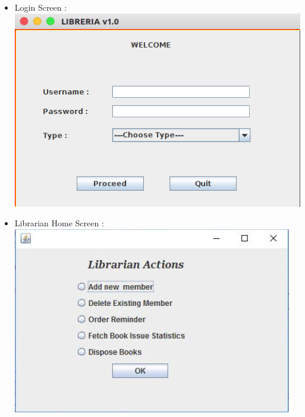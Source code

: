 \documentclass{article}
\begin{document}
\begin{itemize}
\item Login Screen : \\
\includegraphics[scale=0.5]{images/login.png}
\item Librarian Home Screen : \\
\includegraphics[scale=0.5]{images/librarian.png}\\


\end{itemize}
\end{document}
